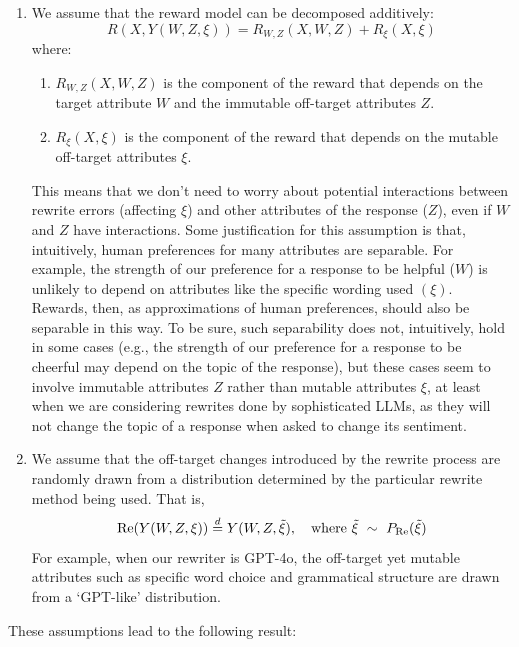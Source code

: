 \documentclass{article}
\begin{document}
\begin{enumerate}
  \item We assume that the reward model can be decomposed additively: 
    \[R(X, Y(W, Z, \xi)) = R_{W, Z}(X, W, Z) + R_{\xi}(X, \xi)\]
  where:
  \begin{enumerate}
    \item $R_{W,Z}(X, W, Z)$ is the component of the reward that depends on the target attribute $W$ and the immutable off-target attributes $Z$.
    \item $R_{\xi}(X, \xi)$ is the component of the reward that depends on the mutable off-target attributes $\xi$.
  \end{enumerate}
  This means that we don't need to worry about potential interactions between rewrite errors (affecting $\xi$) and other attributes of the response ($Z$), even if $W$ and $Z$ have interactions. Some justification for this assumption is that, intuitively, human preferences for many attributes are separable. For example, the strength of our preference for a response to be helpful ($W$) is unlikely to depend on attributes like the specific wording used $(\xi)$. Rewards, then, as approximations of human preferences, should also be separable in this way. To be sure, such separability does not, intuitively, hold in some cases (e.g., the strength of our preference for a response to be cheerful may depend on the topic of the response), but these cases seem to involve immutable attributes $Z$ rather than mutable attributes $\xi$, at least when we are considering rewrites done by sophisticated LLMs, as they will not change the topic of a response when asked to change its sentiment.

  \item We assume that the off-target changes introduced by the rewrite process are randomly drawn from a distribution determined by the particular rewrite method being used. That is,
    \[\text{Re}(Y(W, Z, \xi)) \overset{d}{=} Y(W, Z, \tilde{\xi}), \quad \text{where } \tilde{\xi} \ \sim\  P_\text{Re}(\tilde{\xi})\]
  For example, when our rewriter is GPT-4o, the off-target yet mutable attributes such as specific word choice and grammatical structure are drawn from a `GPT-like' distribution.
\end{enumerate}

These assumptions lead to the following result:
\end{document}
